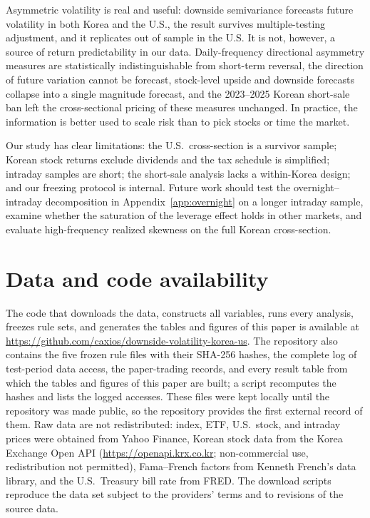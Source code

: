 \documentclass[11pt]{article}
\begin{document}
Asymmetric volatility is real and useful: downside semivariance forecasts future volatility in both Korea and the U.S., the result survives multiple-testing adjustment, and it replicates out of sample in the U.S. It is not, however, a source of return predictability in our data. Daily-frequency directional asymmetry measures are statistically indistinguishable from short-term reversal, the direction of future variation cannot be forecast, stock-level upside and downside forecasts collapse into a single magnitude forecast, and the 2023--2025 Korean short-sale ban left the cross-sectional pricing of these measures unchanged. In practice, the information is better used to scale risk than to pick stocks or time the market.

Our study has clear limitations: the U.S.\ cross-section is a survivor sample; Korean stock returns exclude dividends and the tax schedule is simplified; intraday samples are short; the short-sale analysis lacks a within-Korea design; and our freezing protocol is internal. Future work should test the overnight--intraday decomposition in Appendix~\ref{app:overnight} on a longer intraday sample, examine whether the saturation of the leverage effect holds in other markets, and evaluate high-frequency realized skewness on the full Korean cross-section.

\section*{Data and code availability}

The code that downloads the data, constructs all variables, runs every analysis, freezes rule sets, and generates the tables and figures of this paper is available at \url{https://github.com/caxios/downside-volatility-korea-us}. The repository also contains the five frozen rule files with their SHA-256 hashes, the complete log of test-period data access, the paper-trading records, and every result table from which the tables and figures of this paper are built; a script recomputes the hashes and lists the logged accesses. These files were kept locally until the repository was made public, so the repository provides the first external record of them. Raw data are not redistributed: index, ETF, U.S.\ stock, and intraday prices were obtained from Yahoo Finance, Korean stock data from the Korea Exchange Open API (\url{https://openapi.krx.co.kr}; non-commercial use, redistribution not permitted), Fama--French factors from Kenneth French's data library, and the U.S.\ Treasury bill rate from FRED. The download scripts reproduce the data set subject to the providers' terms and to revisions of the source data.
\end{document}
